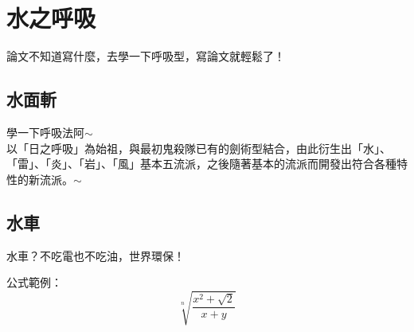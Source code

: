 \chapter{水之呼吸}\label{structure}

論文不知道寫什麼，去學一下呼吸型，寫論文就輕鬆了！

\section{水面斬}
學一下呼吸法阿$\sim$ \\
以「日之呼吸」為始祖，與最初鬼殺隊已有的劍術型結合，由此衍生出「水」、「雷」、「炎」、「岩」、「風」基本五流派，之後隨著基本的流派而開發出符合各種特性的新流派。$\sim$


\section{水車}
水車？不吃電也不吃油，世界環保！

公式範例：
\begin{equation}
   \sqrt[n]{\frac{x^2+\sqrt 2}{x+y}}
\end{equation}
